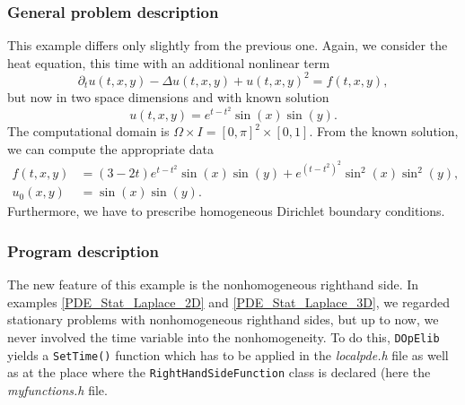 \subsubsection{General problem description}

This example differs only slightly from the previous one. Again, we consider the heat equation, this time with an additional nonlinear term
\begin{equation*}
\partial_t u(t,x,y) - \Delta u(t,x,y) + u(t,x,y)^2 = f(t,x,y),
\end{equation*}
but now in two space dimensions and with known solution 
\begin{equation*}
u(t,x,y) = e^{t-t^2} \sin(x) \sin(y).
\end{equation*}
The computational domain is $\Omega \times I = [0,\pi]^2 \times [0,1]$. From the known solution, we can compute the appropriate data 
\begin{align*}
f(t,x,y) &= (3-2t)e^{t-t^2} \sin(x) \sin(y) + e^{(t-t^2)^2} \sin^2(x) \sin^2(y),\\
u_0(x,y) &= \sin(x) \sin(y).
\end{align*}
Furthermore, we have to prescribe homogeneous Dirichlet boundary conditions.

\subsubsection{Program description}

The new feature of this example is the nonhomogeneous righthand side. In examples \ref{PDE_Stat_Laplace_2D} and \ref{PDE_Stat_Laplace_3D}, we regarded stationary problems with nonhomogeneous righthand sides, but up to now, we never involved the time variable into the nonhomogeneity. To do this, \texttt{DOpElib} yields a \texttt{SetTime()} function which has to be applied in the \textit{localpde.h} file as well as at the place where the \texttt{RightHandSideFunction} class is declared (here the \textit{myfunctions.h} file.
